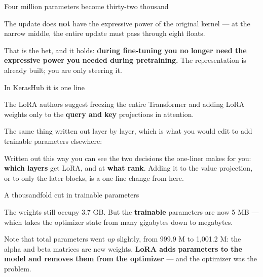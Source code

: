 \documentclass[aspectratio=169,11pt,t]{beamer}
\begin{document}
\begin{frame}[shrink=25]{Four million parameters become thirty-two thousand}
\begin{minipage}[t]{0.3253\textwidth}
\end{minipage}%
\hfill
\begin{minipage}[t]{0.3253\textwidth}
\end{minipage}%
\hfill
\begin{minipage}[t]{0.3253\textwidth}
\end{minipage}%
{\fontsize{9.4}{12.6}\selectfont\color{fg2}The update does \textbf{not} have the expressive power of the original kernel --- at the narrow middle, the entire update must pass through eight floats.\par}\vskip 4pt
\begin{iband}[signal]
That is the bet, and it holds: \textbf{during fine-tuning you no longer need the expressive power you needed during pretraining.} The representation is already built; you are only steering it.
\end{iband}
\end{frame}

\begin{frame}[shrink=25]{In KerasHub it is one line}
{\fontsize{9.4}{12.6}\selectfont\color{fg2}The LoRA authors suggest freezing the entire Transformer and adding LoRA weights only to the \textbf{query and key} projections in attention.\par}\vskip 4pt
{\fontsize{9.4}{12.6}\selectfont\color{fg2}The same thing written out layer by layer, which is what you would edit to add trainable parameters elsewhere:\par}\vskip 4pt
{\fontsize{9.4}{12.6}\selectfont\color{fg2}Written out this way you can see the two decisions the one-liner makes for you: \textbf{which layers} get LoRA, and at \textbf{what rank}. Adding it to the value projection, or to only the later blocks, is a one-line change from here.\par}\vskip 4pt
\end{frame}

\begin{frame}[shrink=25]{A thousandfold cut in trainable parameters}
{\fontsize{9.4}{12.6}\selectfont\color{fg2}The weights still occupy 3.7 GB. But the \textbf{trainable} parameters are now 5 MB --- which takes the optimizer state from many gigabytes down to megabytes.\par}\vskip 4pt
{\fontsize{9.4}{12.6}\selectfont\color{fg2}Note that total parameters went \textit{up} slightly, from 999.9 M to 1,001.2 M: the alpha and beta matrices are new weights. \textbf{LoRA adds parameters to the model and removes them from the optimizer} --- and the optimizer was the problem.\par}\vskip 4pt
\end{frame}
\end{document}
